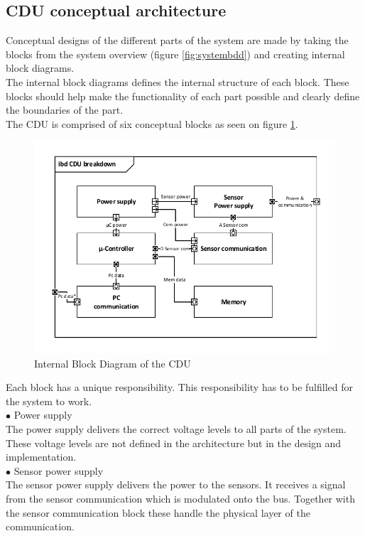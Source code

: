 \subsection{CDU conceptual architecture}
Conceptual designs of the different parts of the system are made by taking the blocks from the system overview (figure \ref{fig:systembdd}) and creating internal block diagrams.\\
The internal block diagrams defines the internal structure of each block. These blocks should help make the functionality of each part possible and clearly define the boundaries of the part.\\
The CDU is comprised of six conceptual blocks as seen on figure \ref{CDU_IBD}. 
\begin{figure}[H]
	\centering
	\includegraphics[width=.8\textwidth]{billeder/11ProjectDescription/CDU_IBD}
	\caption{Internal Block Diagram of the CDU}
	\label{CDU_IBD}
\end{figure}
Each block has a unique responsibility. This responsibility has to be fulfilled for the system to work.\\
\hspace*{.6cm}$\bullet$ Power supply \\
The power supply delivers the correct voltage levels to all parts of the system. These voltage levels are not defined in the architecture but in the design and implementation.\\
\hspace*{.6cm}$\bullet$ Sensor power supply\\
The sensor power supply delivers the power to the sensors. It receives a signal from the sensor communication which is modulated onto the bus. Together with the sensor communication block these handle the physical layer of the communication.\\
